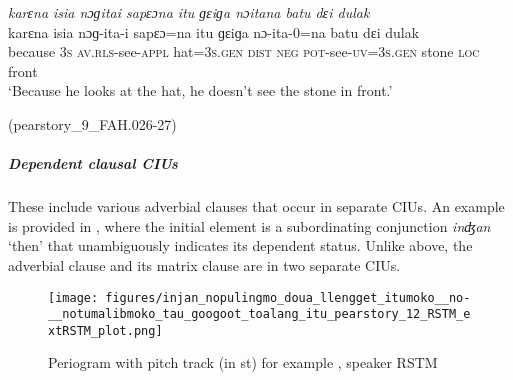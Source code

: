 {
	\ex
	\label{karena isia nogitai sapeona itu geiga noitana batu dɛi dulak}
	\textit{karɛna isia nɔɡitai sapɛɔna itu ɡɛiɡa nɔitana batu dɛi dulak} \\
	\gll karɛna isia nɔɡ-ita-i sapɛɔ=na itu ɡɛiɡa nɔ-ita-0=na batu dɛi dulak\\
	because 3\textsc{s} \textsc{av.rls}-see\textsc{-appl} hat=3\textsc{s}.\textsc{gen} \textsc{dist} \textsc{neg} \textsc{pot}-see-\textsc{uv=}3\textsc{s}.\textsc{gen} stone \textsc{loc} front\\
	\glt `Because he looks at the hat, he doesn't see the stone in front.'
	\begin{flushright}(pearstory\_9\_FAH.026-27)
		\end{flushright}
}
\z
\z





\subparagraph{Dependent clausal CIUs}
\label{sec:dependent-clausal-cius} 

These  include various adverbial clauses that occur in separate CIUs. An example is provided in  , where the initial element is a subordinating conjunction  \textit{inʤan} `then' that unambiguously indicates its dependent status. Unlike  above, the adverbial clause and its matrix clause are in two separate CIUs.



\begin{figure}
	\texttt{[image: figures/injan\_nopulingmo\_doua\_llengget\_itumoko\_\_no-\_\_notumalibmoko\_tau\_googoot\_toalang\_itu\_pearstory\_12\_RSTM\_extRSTM\_plot.png]}
	\caption{Periogram with pitch track (in st) for example , speaker RSTM}
	\label{pitch:free simple AdvCl}
\end{figure}

\ea
\label{ex:free simple AdvCl}

